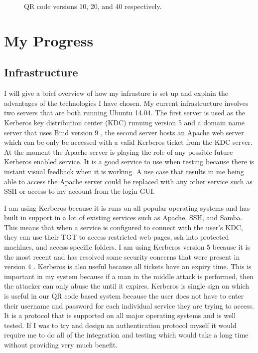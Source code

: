 \documentclass[]{report}   %
\begin{document}
\begin{figure}[H]
\centering
\caption{QR code versions 10, 20, and 40 respectively.}
\end{figure}

\section{My Progress}
\subsection{Infrastructure} 
I will give a brief overview of how my infrasture is set up and explain the advantages of the technologies I have chosen. My current infrastructure involves two servers that are both running Ubuntu 14.04. The first server is used as the Kerberos key distribution center (KDC) running version 5 and a domain name server that uses Bind version 9 \cite{Bind}, the second server hosts an Apache web server which can be only be accessed with a valid Kerberos ticket from the KDC server. At the moment the Apache server is playing the role of any possible future Kerberos enabled service. It is a good service to use when testing because there is instant visual feedback when it is working. A use case that results in me being able to access the Apache server could be replaced with any other service such as SSH or access to my account from the login GUI.

I am using Kerberos because it is runs on all popular operating systems and has built in support in a lot of existing services such as Apache, SSH, and Samba. This means that when a service is configured to connect with the user's KDC, they can use their TGT to access restricted web pages, ssh into protected machines, and access specific folders. I am using Kerberos version 5 because it is the most recent and has resolved some security concerns that were present in version 4 \cite{KerbUpdate}. Kerberos is also useful because all tickets have an expiry time. This is important in my system because if a man in the middle attack is performed, then the attacker can only abuse the until it expires. Kerberos is single sign on which is useful in our QR code based system because the user does not have to enter their username and password for each individual service they are trying to access. It is a protocol that is supported on all major operating systems and is well tested. If I was to try and design an authentication protocol myself it would require me to do all of the integration and testing which would take a long time without providing very much benefit.
\end{document}
